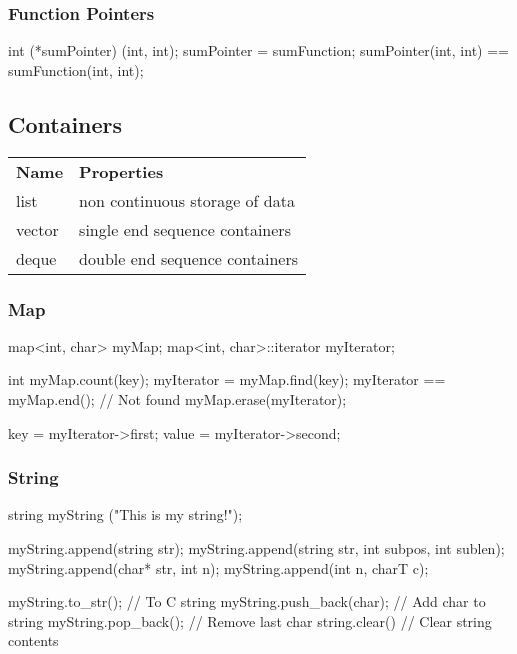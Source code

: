 \documentclass[10pt,a4paper]{extarticle}
\begin{document}
\begin{multicols}{2}
\subsubsection*{Function Pointers}
\begin{cppcode}
  int (*sumPointer) (int, int);
  sumPointer = sumFunction;
  sumPointer(int, int) == sumFunction(int, int);
\end{cppcode}

\subsection*{Containers}

\begin{tabular}{ll}
\textbf{Name} \hspace{0.6cm} & \textbf{Properties} \\
list & non continuous storage of data \\
vector & single end sequence containers \\
deque & double end sequence containers \\
\end{tabular}

\subsubsection*{Map}
\begin{cppcode}
  map<int, char> myMap;
  map<int, char>::iterator myIterator;

  int myMap.count(key);
  myIterator = myMap.find(key);
  myIterator == myMap.end();    // Not found
  myMap.erase(myIterator);

  key = myIterator->first;
  value = myIterator->second;
\end{cppcode}

\subsubsection*{String}
\begin{cppcode}
  string myString ("This is my string!");

  myString.append(string str);
  myString.append(string str, int subpos, int sublen);
  myString.append(char* str, int n);
  myString.append(int n, charT c);

  myString.to_str();        // To C string
  myString.push_back(char); // Add char to string
  myString.pop_back();      // Remove last char
  string.clear()            // Clear string contents
\end{cppcode}
\end{multicols}
\end{document}
